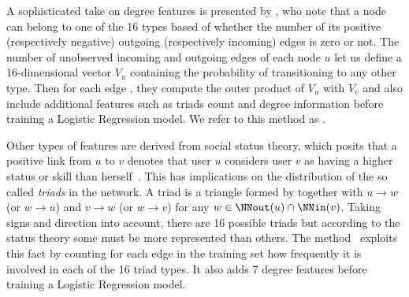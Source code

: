 \begin{newcontent}
A sophisticated take on degree features is presented by \textcite{Bayesian15}, who note that a node
can belong to one of the 16 types based of whether the number of its positive (respectively
negative) outgoing (respectively incoming) edges is zero or not. The number of unobserved incoming
and outgoing edges of each node $u$ let us define a 16-dimensional vector $V_u$ containing the
probability of transitioning to any other type. Then for each edge \euv, they compute the outer
product of $V_u$ with $V_v$ and also include additional features such as triads count and degree
information before training a Logistic Regression model. We refer to this method as
\emph{\compbayesian{}}.

Other types of features are derived from social status theory, which posits that a positive link
from $u$ to $v$ denotes that user $u$ considers user $v$ as having a higher status or skill than
herself~\autocite{Leskovec2010}. This has implications on the distribution of the so called
\emph{triads} in the network. A triad is a triangle formed by \euv{} together with $u \rightarrow w$
(or $w \rightarrow u$) and $v \rightarrow w$ (or $w \rightarrow v$) for any $w \in \NNout(u) \cap
\NNin(v)$. Taking signs and direction into account, there are 16 possible triads but according to
the status theory some must be more represented than others. The \emph{\comptriads{}}
method~\autocite{Leskovec2010} exploits this fact by counting for each edge in the training set how
frequently it is involved in each of the 16 triad types. It also adds 7 degree features before
training a Logistic Regression model.


\end{newcontent}
